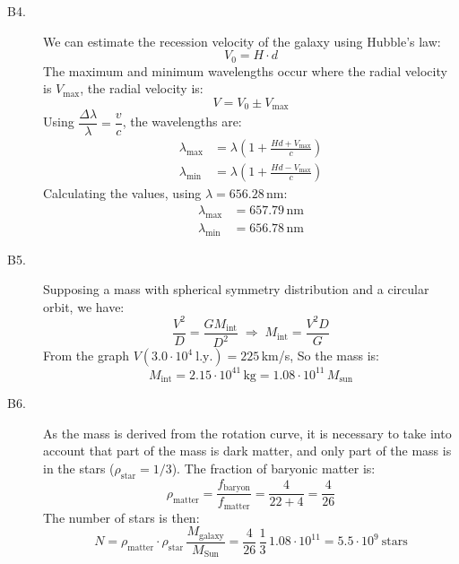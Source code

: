 \begin{description}
\item[B4.] We can estimate the recession velocity of the galaxy using
  Hubble's law:
  \[ V_0 = H\cdot d \]
  The maximum and minimum wavelengths occur where the radial velocity is
  $V_{\mathrm{max}}$, the radial velocity is:
  \[ V = V_0 \pm V_{\mathrm{max}} \]
  Using $\dfrac{\Delta\lambda}{\lambda} = \dfrac{v}{c}$, the wavelengths are:
  \begin{align*}
    \lambda_{\mathrm{max}} &= \lambda\left(1
      + \frac{Hd + V_{\mathrm{max}}}{c}\right) \\
    \lambda_{\mathrm{min}} &= \lambda\left(1
      + \frac{Hd - V_{\mathrm{max}}}{c}\right)
  \end{align*}
  Calculating the values, using $\lambda = 656.28$\,nm:
  \begin{align*}
    \lambda_{\mathrm{max}} &= 657.79\,\mathrm{nm} \\
    \lambda_{\mathrm{min}} &= 656.78\,\mathrm{nm}
  \end{align*}

\item[B5.] Supposing a mass with spherical symmetry distribution and a
  circular orbit, we have:
  \[ \frac{V^2}{D} = \frac{G M_{\mathrm{int}}}{D^2} \;\Rightarrow\;
     M_{\mathrm{int}} = \frac{V^2 D}{G} \]
  From the graph $V(3.0\cdot 10^{4}\ \mathrm{l.y.}) = 225$\,km/s, So the mass
  is:
  \[ M_{\mathrm{int}} = 2.15\cdot 10^{41}\,\mathrm{kg}
     = 1.08\cdot 10^{11}\,M_{\mathrm{sun}} \]

\item[B6.] As the mass is derived from the rotation curve, it is necessary to
  take into account that part of the mass is dark matter, and only part of the
  mass is in the stars ($\rho_{\mathrm{star}} = 1/3$). The fraction of
  baryonic matter is:
  \[ \rho_{\mathrm{matter}} = \frac{f_{\mathrm{baryon}}}{f_{\mathrm{matter}}}
     = \frac{4}{22+4} = \frac{4}{26} \]
  The number of stars is then:
  \[ N = \rho_{\mathrm{matter}}\cdot\rho_{\mathrm{star}}\,
     \frac{M_{\mathrm{galaxy}}}{M_{\mathrm{Sun}}}
     = \frac{4}{26}\,\frac{1}{3}\,1.08\cdot 10^{11}
     = 5.5\cdot 10^{9}\ \text{stars} \]
\end{description}
